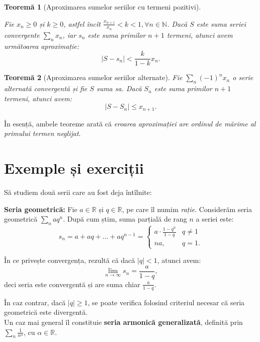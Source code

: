 \documentclass[11pt,a4paper]{article}
\newcommand\NN{\mathbb{N}}
\newcommand\RR{\mathbb{R}}
\theoremstyle{dotless}
\newtheorem{theorem}{Teorem\u{a}}[section]
\theoremstyle{dotlessdr}
\begin{document}
\begin{theorem}[Aproximarea sumelor seriilor cu termeni pozitivi]\label{thm:aprox-poz}
  
  Fie $x_n \geq 0$ și $k \geq 0$, astfel încît $\frac{x_{n+1}}{x_n} < k < 1, \forall n \in \NN$.
  Dacă $S$ este suma seriei convergente $\sum_n x_n$, iar $s_n$ este suma primilor $n + 1$
  termeni, atunci avem următoarea aproximație:
  \[
    | S - s_n | < \frac{k}{1 - k} x_n.
  \]
\end{theorem}

\begin{theorem}[Aproximarea sumelor seriilor alternate]\label{thm:aprox-alt}
  Fie $\sum_n (-1)^n x_n$ o serie alternată convergentă și fie $S$ suma sa. Dacă $S_n$ este suma
  primilor $n + 1$ termeni, atunci avem:
  \[
    | S - S_n | \leq x_{n + 1}.
  \]
\end{theorem}

În esență, ambele teoreme arată că \emph{eroarea aproximației are ordinul de mărime %
al primului termen neglijat}.


\section{Exemple și exerciții}

Să studiem două serii care au fost deja întîlnite:

\textbf{Seria geometrică:} Fie $a \in \RR$ și $q \in \RR$, pe care îl numim \emph{rație}.
Considerăm seria geometrică $\sum_n aq^n$. După cum știm, suma parțială de rang $n$
a seriei este:
\[
  s_n = a + aq + \dots + aq^{n-1} = %
  \begin{cases}
    a \cdot \frac{1 - q^n}{1 - q}  & q \neq 1 \\
    na, & q = 1.
  \end{cases}
\]

În ce privește convergența, rezultă că dacă $|q| < 1$, atunci avem:
\[
  \lim_{n \to \infty} s_n = \frac{a}{1 - q},
\]
deci seria este convergentă și are suma chiar $\frac{a}{1 - q}$.

În caz contrar, dacă $|q| \geq 1$, se poate verifica folosind criteriul necesar că seria
geometrică este divergentă. \\

Un caz mai general îl constituie \textbf{seria armonică generalizată}, definită prin
$\sum_n \frac{1}{n^\alpha}$, cu $\alpha \in \RR$.
\end{document}
